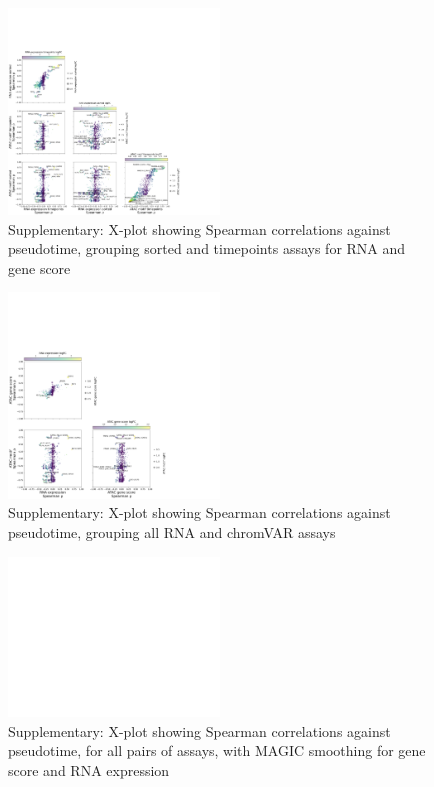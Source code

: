 \documentclass[a4paper]{article}
\begin{document}
\begin{figure}[!htb]
  \centering
  \includegraphics[width=0.5\textwidth]{../figures/hematopoiesis/Erythroid_40_103_smooth_none_semi_detailed_X_plot.png}
  \caption{Supplementary: X-plot showing Spearman correlations against pseudotime, grouping sorted and timepoints assays for RNA and gene score}
\end{figure}

\begin{figure}[!htb]
  \centering
  \includegraphics[width=0.5\textwidth]{../figures/hematopoiesis/Erythroid_40_103_smooth_none_grouped_X_plot.png}
  \caption{Supplementary: X-plot showing Spearman correlations against pseudotime, grouping all RNA and chromVAR assays}
\end{figure}


\begin{figure}[!htb]
  \centering
  \includegraphics[width=0.5\textwidth]{../figures/hematopoiesis/Erythroid_40_103_smooth_magic_detailed_X_plot.png}
  \caption{Supplementary: X-plot showing Spearman correlations against pseudotime, for all pairs of assays, with MAGIC smoothing for gene score and RNA expression}
\end{figure}
\end{document}
